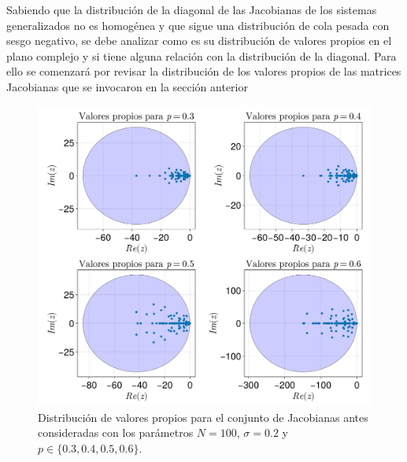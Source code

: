 Sabiendo que la distribución de la diagonal de las Jacobianas de los sistemas generalizados no es homogénea y que sigue una distribución de cola pesada con sesgo negativo, se debe analizar como es su distribución de valores propios en el plano complejo y si tiene alguna relación con la distribución de la diagonal. Para ello se comenzará por revisar la distribución de los valores propios de las matrices Jacobianas que se invocaron en la sección anterior
\begin{figure}[h!]
	\centering
	\includegraphics[scale=0.24]{../Imagenes/DistEigenvalores}
	\caption{Distribución de valores propios para el conjunto de Jacobianas antes consideradas con los parámetros $N=100$, $\sigma=0.2$ y $p\in\{0.3,0.4,0.5,0.6\}$.}
	\label{fig:DistEigenvalores}
\end{figure}


